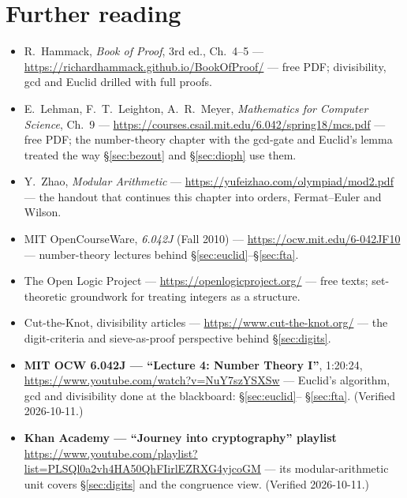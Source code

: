 \section*{Further reading}
\begin{itemize}
\item R.~Hammack, \emph{Book of Proof}, 3rd ed., Ch.~4--5 ---
\url{https://richardhammack.github.io/BookOfProof/} --- free PDF;
divisibility, gcd and Euclid drilled with full proofs.
\item E.~Lehman, F.~T.~Leighton, A.~R.~Meyer, \emph{Mathematics for
Computer Science}, Ch.~9 ---
\url{https://courses.csail.mit.edu/6.042/spring18/mcs.pdf} --- free PDF;
the number-theory chapter with the gcd-gate and Euclid's lemma treated the
way \S\ref{sec:bezout} and \S\ref{sec:dioph} use them.
\item Y.~Zhao, \emph{Modular Arithmetic} ---
\url{https://yufeizhao.com/olympiad/mod2.pdf} --- the handout
that continues this chapter into orders, Fermat--Euler and Wilson.
\item MIT OpenCourseWare, \emph{6.042J} (Fall 2010) ---
\url{https://ocw.mit.edu/6-042JF10} --- number-theory lectures behind
\S\ref{sec:euclid}--\S\ref{sec:fta}.
\item The Open Logic Project ---
\url{https://openlogicproject.org/} --- free texts; set-theoretic
groundwork for treating integers as a structure.
\item Cut-the-Knot, divisibility articles ---
\url{https://www.cut-the-knot.org/} --- the digit-criteria and
sieve-as-proof perspective behind \S\ref{sec:digits}.
\end{itemize}

\begin{rulebox}
\begin{itemize}
\item \textbf{MIT OCW 6.042J --- ``Lecture 4: Number Theory I''}, 1:20:24,
\url{https://www.youtube.com/watch?v=NuY7szYSXSw} --- Euclid's
algorithm, gcd and divisibility done at the blackboard: \S\ref{sec:euclid}--%
\S\ref{sec:fta}. (Verified 2026-10-11.)
\item \textbf{Khan Academy --- ``Journey into cryptography'' playlist}
\url{https://www.youtube.com/playlist?list=PLSQl0a2vh4HA50QhFIirlEZRXG4yjcoGM}
--- its modular-arithmetic unit covers \S\ref{sec:digits} and the
congruence view. (Verified 2026-10-11.)
\end{itemize}
\end{rulebox}

